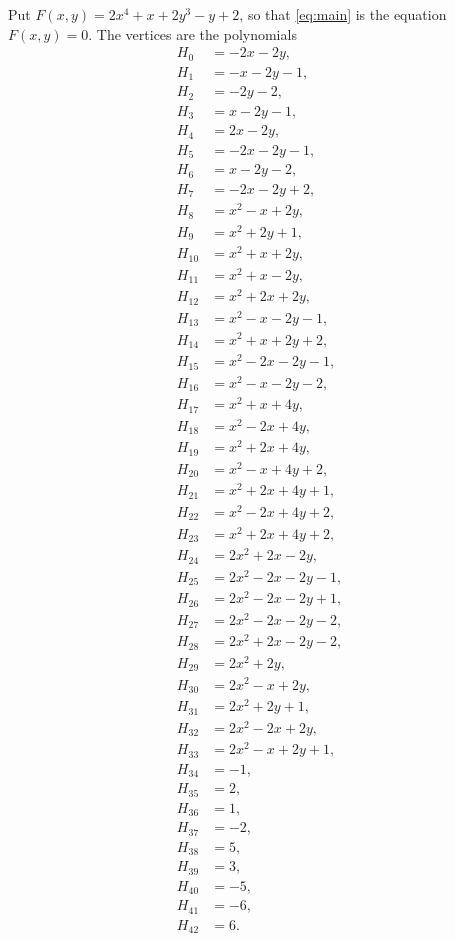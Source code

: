 \documentclass[11pt]{article}
\begin{document}
Put $F(x,y)=2x^{4}+x+2y^{3}-y+2$, so that \eqref{eq:main} is the equation $F(x,y)=0$. The vertices are the polynomials
\begin{align*}
H_{0}&=-2x-2y,\\
H_{1}&=-x-2y-1,\\
H_{2}&=-2y-2,\\
H_{3}&=x-2y-1,\\
H_{4}&=2x-2y,\\
H_{5}&=-2x-2y-1,\\
H_{6}&=x-2y-2,\\
H_{7}&=-2x-2y+2,\\
H_{8}&=x^{2}-x+2y,\\
H_{9}&=x^{2}+2y+1,\\
H_{10}&=x^{2}+x+2y,\\
H_{11}&=x^{2}+x-2y,\\
H_{12}&=x^{2}+2x+2y,\\
H_{13}&=x^{2}-x-2y-1,\\
H_{14}&=x^{2}+x+2y+2,\\
H_{15}&=x^{2}-2x-2y-1,\\
H_{16}&=x^{2}-x-2y-2,\\
H_{17}&=x^{2}+x+4y,\\
H_{18}&=x^{2}-2x+4y,\\
H_{19}&=x^{2}+2x+4y,\\
H_{20}&=x^{2}-x+4y+2,\\
H_{21}&=x^{2}+2x+4y+1,\\
H_{22}&=x^{2}-2x+4y+2,\\
H_{23}&=x^{2}+2x+4y+2,\\
H_{24}&=2x^{2}+2x-2y,\\
H_{25}&=2x^{2}-2x-2y-1,\\
H_{26}&=2x^{2}-2x-2y+1,\\
H_{27}&=2x^{2}-2x-2y-2,\\
H_{28}&=2x^{2}+2x-2y-2,\\
H_{29}&=2x^{2}+2y,\\
H_{30}&=2x^{2}-x+2y,\\
H_{31}&=2x^{2}+2y+1,\\
H_{32}&=2x^{2}-2x+2y,\\
H_{33}&=2x^{2}-x+2y+1,\\
H_{34}&=-1,\\
H_{35}&=2,\\
H_{36}&=1,\\
H_{37}&=-2,\\
H_{38}&=5,\\
H_{39}&=3,\\
H_{40}&=-5,\\
H_{41}&=-6,\\
H_{42}&=6.
\end{align*}
\end{document}

